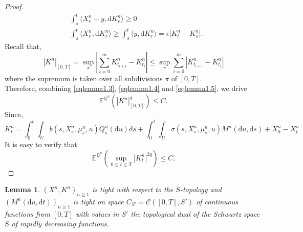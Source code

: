 \documentclass[11pt,amsfonts]{article}
\theoremstyle{plain}
\newtheorem{lemma}{Lemma}
\theoremstyle{assumpstyle}
\numberwithin{equation}{section}
\numberwithin{theorem}{section}
\numberwithin{proposition}{section}
\numberwithin{definition}{section}
\numberwithin{remark}{section}
\numberwithin{corollary}{section}
\numberwithin{lemma}{section}
\begin{document}
\begin{proof}
\begin{equation}
\begin{split}
&\int_{s}^{t}\langle X^n_r-y, \mathrm{d}K^n_r \rangle \geq 0\\
&\int_{s}^{t}\langle X^n_r, \mathrm{d}K^n_r \rangle \geq \int_{s}^{t}\langle y, \mathrm{d}K^n_r \rangle = \epsilon |K^n_t-K^n_s|.
\end{split} \label{eqlemma1.4}
\end{equation}
Recall that,
\begin{equation}\label{eqlemma1.5}
|K^n|_{[0, T]} =\sup_{\pi}|\sum_{i=0}^{m} K^n_{t_{i+1}}-K^n_{t_{i}}|\leq \sup_{\pi}\sum_{i=0}^{m} |K^n_{t_{i+1}}-K^n_{t_{i}}| 
\end{equation}
where the supremum is taken over all subdivisions $\pi$ of $[0, T]$.\\
Therefore, combining \eqref{eqlemma1.3}, \eqref{eqlemma1.4} and \eqref{eqlemma1.5}, we drive 
\begin{equation*}
\mathbb{E}^{\mathbb{Q}^n}\left( |K^n|^q_{[0, T]} \right) \leq C.
\end{equation*}
Since, 
\begin{equation*}
K^n_t = \displaystyle \int_{0}^{t} \displaystyle\int_{U}^{} b(s,X^n_s,\mu^n_s, u)Q^n_s(\mathrm{d}u)\mathrm{d}s+ \int_{0}^{t}\int_{U}^{}\sigma(s,X^n_s,\mu^n_s, u) M^n(\mathrm{d}u,\mathrm{d}s)+X^n_0-X^n_t
\end{equation*}
It is easy to verify that 
\begin{equation*}
\mathbb{E}^{\mathbb{Q}^n}\left(\sup_{0 \leq t \leq T} |K^n_t|^{2q} \right) \leq C.
\end{equation*}
\end{proof}
\begin{lemma}\label{lemma2}
$(X^n, K^n)_{n \geq 1}$ is tight with respect to the $S$-topology and $(M^n(\mathrm{d}u, \mathrm{d}t))_{n \geq 1}$ is tight on space $C_{S'}=\mathcal{C}([0, T], S')$ of continuous functions from $[0, T]$ with values in $S'$ the topological dual of the Schwartz space $S$ of rapidly decreasing functions.
\end{lemma}
\end{document}
